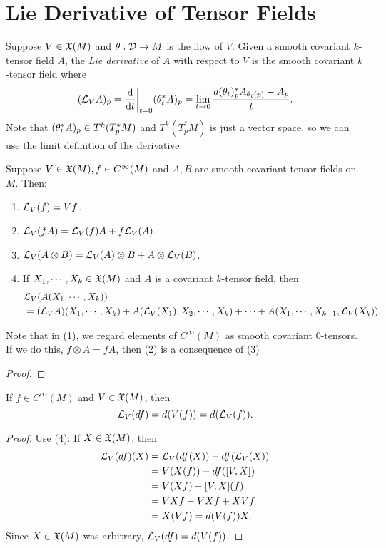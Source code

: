 \section{Lie Derivative of Tensor Fields}
\begin{definition}
    Suppose $V \in \frak{X}(M)$ and $\theta:\mathcal{D} \to M$ is the flow of $V$. Given a smooth covariant $k$-tensor field $A$, the \textit{Lie derivative} of $A$ with respect to $V$ is the smooth covariant $k$-tensor field where
    $$(\mathcal{L}_V A)_p = \dv{}{t}\bigg|_{t=0} (\theta_t^* A)_p = \lim_{t \to 0} \frac{d(\theta_t)_p^* A_{\theta_t(p)} - A_p}{t}. $$
    Note that $(\theta_t^* A)_p \in T^k(T_p^*M)$ and $T^k(T_p^*M)$ is just a vector space, so we can use the limit definition of the derivative. 
\end{definition}
\begin{proposition}
    Suppose $V \in \frak{X}(M), f \in C^\infty(M)$ and $A,B$ are smooth covariant tensor fields on $M$. Then:
    \begin{enumerate}
    \item $\mathcal{L}_V(f) = Vf$.
    \item $\mathcal{L}_V(fA) = \mathcal{L}_V(f)A + f\mathcal{L}_V(A)$.
    \item $\mathcal{L}_V(A \otimes B) = \mathcal{L}_V(A) \otimes B + A \otimes \mathcal{L}_V(B)$.
    \item If $X_1,\cdots,X_k \in \frak{X}(M)$ and $A$ is a covariant $k$-tensor field, then 
    \begin{align*}
    &\mathcal{L}_V(A(X_1,\cdots,X_k) ) \\
    &= (\mathcal{L}_V A)(X_1,\cdots,X_k) + A(\mathcal{L}_V(X_1), X_2,\cdots,X_k) + \cdots + A(X_1,\cdots,X_{k-1},\mathcal{L}_V(X_k)).    
    \end{align*}
    \end{enumerate}
    Note that in (1), we regard elements of $C^\infty(M)$ as smooth covariant $0$-tensors. If we do this, $f \otimes A = fA$, then (2) is a consequence of (3)
\end{proposition}
\begin{proof}
    
\end{proof}
\begin{corollary}\label{12.3.4}
    If $f \in C^\infty(M)$ and $V \in \frak{X}(M)$, then $$\mathcal{L}_V(df) = d(V(f)) = d(\mathcal{L}_V(f)). $$
\end{corollary}
\begin{proof}
    Use (4): If $X \in \frak{X}(M)$, then 
    \begin{align*}
    \mathcal{L}_V(df)(X) &= 
    \mathcal{L}_V(df(X)) - df(\mathcal{L}_V(X)) \\
    &= V(X(f)) - df([V,X]) \\
    &= V(Xf) - [V,X](f) \\
    &= VXf - VXf + XVf \\
    &= X(Vf) = d(V(f))X.
    \end{align*}
    Since $X \in \frak{X}(M)$ was arbitrary, $\mathcal{L}_V(df) = d(V(f))$. 
\end{proof}
